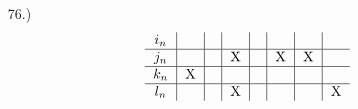 \documentclass[12pt]{article}
\newcommand{\vertb}[1]{\left\vert#1\right\vert}
\newcommand{\e}{\varepsilon}
\begin{document}
\begin{itemize}











    \item [76.)]
    \[
    \begin{tabular}{c|c|c|c|c|c|c|c}
        $i_n$ & & & & & & & \\
        \hline
        $j_n$ & & & X & & X & X \\
        \hline
        $k_n$ & X & & & & & & \\
        \hline
        $l_n$ & & & X & & & & X \\
    \end{tabular}
    \]


\end{itemize}
\end{document}
